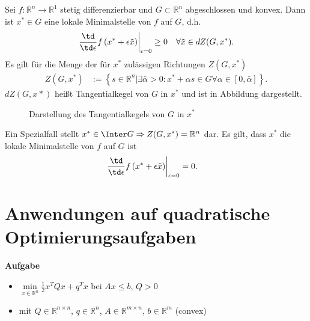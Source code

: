 Sei $f:\mathbb{R}^n\rightarrow\mathbb{R}^1$ stetig differenzierbar und $G\subset\mathbb{R}^n$ abgeschlossen und konvex. Dann ist $x^{\ast}\in G$ eine
lokale Minimalstelle von $f$ auf $G$, d.h.
\begin{align*}
	\left.\frac{\td}{\td \epsilon}f\left(x^{\ast}+\epsilon\tilde{x} \right)\right|_{\epsilon=0}& \geq 0\quad \forall \tilde{x}\in dZ(G,x^{\ast}).\\
\end{align*}
Es gilt für die Menge der für $x^{\ast}$ zulässigen Richtungen $Z(G,x^{\ast})$
\begin{align*}
	Z(G,x^{\ast}) & := \left\{s\in\mathbb{R}^n|\exists\bar{\alpha}>0:x^{\ast}+\alpha s\in G\forall\alpha\in[0,\bar{\alpha}] \right\}.
\end{align*}
$d Z(G,x{\ast})$ heißt Tangentialkegel von $G$ in $x^{\ast}$ und ist in Abbildung  dargestellt.
\begin{figure}[htb]
	\centering
	
	\caption{Darstellung des Tangentialkegels von $G$ in $x^{\ast}$}
	\label{fig:kap_1_tangentialkegel}
\end{figure}
Ein Spezialfall stellt $x^{\ast}\in\Inter G\Rightarrow Z(G,x^{\ast})=\mathbb{R}^n$ dar. Es gilt, dass $x^{\ast}$ die lokale Minimalstelle von $f$
auf $G$ ist
\begin{align*}
	\left.\frac{\td}{\td \epsilon}f\left(x^{\ast}+\epsilon\tilde{x} \right)\right|_{\epsilon=0} & = 0.
\end{align*}

\section{Anwendungen auf quadratische Optimierungsaufgaben}
\textbf{Aufgabe}
\begin{itemize}
	\item[] $\min\limits_{x\in\mathbb{R}^n} \frac12 x^TQx+q^Tx$ bei $Ax\le b$, $Q>0$
	\item[] mit $Q\in\mathbb{R}^{n\times n}$, $q\in\mathbb{R}^n$, $A\in\mathbb{R}^{m\times n}$, $b\in\mathbb{R}^m$ (convex) 
\end{itemize}
